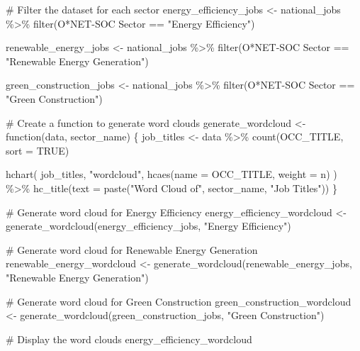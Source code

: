 \documentclass[
  letterpaper,
  DIV=11,
  numbers=noendperiod]{scrartcl}
\newenvironment{Shaded}{\begin{snugshade}}{\end{snugshade}}
\newcommand{\AttributeTok}[1]{\textcolor[rgb]{0.40,0.45,0.13}{#1}}
\newcommand{\CommentTok}[1]{\textcolor[rgb]{0.37,0.37,0.37}{#1}}
\newcommand{\ConstantTok}[1]{\textcolor[rgb]{0.56,0.35,0.01}{#1}}
\newcommand{\ControlFlowTok}[1]{\textcolor[rgb]{0.00,0.23,0.31}{#1}}
\newcommand{\FunctionTok}[1]{\textcolor[rgb]{0.28,0.35,0.67}{#1}}
\newcommand{\NormalTok}[1]{\textcolor[rgb]{0.00,0.23,0.31}{#1}}
\newcommand{\OtherTok}[1]{\textcolor[rgb]{0.00,0.23,0.31}{#1}}
\newcommand{\SpecialCharTok}[1]{\textcolor[rgb]{0.37,0.37,0.37}{#1}}
\newcommand{\StringTok}[1]{\textcolor[rgb]{0.13,0.47,0.30}{#1}}
\begin{document}
\begin{Shaded}
\begin{Highlighting}[]
\CommentTok{\# Filter the dataset for each sector}
\NormalTok{energy\_efficiency\_jobs }\OtherTok{\textless{}{-}}\NormalTok{ national\_jobs }\SpecialCharTok{\%\textgreater{}\%}
  \FunctionTok{filter}\NormalTok{(}\StringTok{\textasciigrave{}}\AttributeTok{O*NET{-}SOC Sector}\StringTok{\textasciigrave{}} \SpecialCharTok{==} \StringTok{"Energy Efficiency"}\NormalTok{)}

\NormalTok{renewable\_energy\_jobs }\OtherTok{\textless{}{-}}\NormalTok{ national\_jobs }\SpecialCharTok{\%\textgreater{}\%}
  \FunctionTok{filter}\NormalTok{(}\StringTok{\textasciigrave{}}\AttributeTok{O*NET{-}SOC Sector}\StringTok{\textasciigrave{}} \SpecialCharTok{==} \StringTok{"Renewable Energy Generation"}\NormalTok{)}

\NormalTok{green\_construction\_jobs }\OtherTok{\textless{}{-}}\NormalTok{ national\_jobs }\SpecialCharTok{\%\textgreater{}\%}
  \FunctionTok{filter}\NormalTok{(}\StringTok{\textasciigrave{}}\AttributeTok{O*NET{-}SOC Sector}\StringTok{\textasciigrave{}} \SpecialCharTok{==} \StringTok{"Green Construction"}\NormalTok{)}

\CommentTok{\# Create a function to generate word clouds}
\NormalTok{generate\_wordcloud }\OtherTok{\textless{}{-}} \ControlFlowTok{function}\NormalTok{(data, sector\_name) \{}
\NormalTok{  job\_titles }\OtherTok{\textless{}{-}}\NormalTok{ data }\SpecialCharTok{\%\textgreater{}\%}
    \FunctionTok{count}\NormalTok{(OCC\_TITLE, }\AttributeTok{sort =} \ConstantTok{TRUE}\NormalTok{)}
  
  \FunctionTok{hchart}\NormalTok{(}
\NormalTok{    job\_titles, }
    \StringTok{"wordcloud"}\NormalTok{, }
    \FunctionTok{hcaes}\NormalTok{(}\AttributeTok{name =}\NormalTok{ OCC\_TITLE, }\AttributeTok{weight =}\NormalTok{ n)}
\NormalTok{  ) }\SpecialCharTok{\%\textgreater{}\%}
    \FunctionTok{hc\_title}\NormalTok{(}\AttributeTok{text =} \FunctionTok{paste}\NormalTok{(}\StringTok{"Word Cloud of"}\NormalTok{, sector\_name, }\StringTok{"Job Titles"}\NormalTok{))}
\NormalTok{\}}

\CommentTok{\# Generate word cloud for Energy Efficiency}
\NormalTok{energy\_efficiency\_wordcloud }\OtherTok{\textless{}{-}} \FunctionTok{generate\_wordcloud}\NormalTok{(energy\_efficiency\_jobs, }\StringTok{"Energy Efficiency"}\NormalTok{)}

\CommentTok{\# Generate word cloud for Renewable Energy Generation}
\NormalTok{renewable\_energy\_wordcloud }\OtherTok{\textless{}{-}} \FunctionTok{generate\_wordcloud}\NormalTok{(renewable\_energy\_jobs, }\StringTok{"Renewable Energy Generation"}\NormalTok{)}

\CommentTok{\# Generate word cloud for Green Construction}
\NormalTok{green\_construction\_wordcloud }\OtherTok{\textless{}{-}} \FunctionTok{generate\_wordcloud}\NormalTok{(green\_construction\_jobs, }\StringTok{"Green Construction"}\NormalTok{)}

\CommentTok{\# Display the word clouds}
\NormalTok{energy\_efficiency\_wordcloud}
\end{Highlighting}
\end{Shaded}
\end{document}

